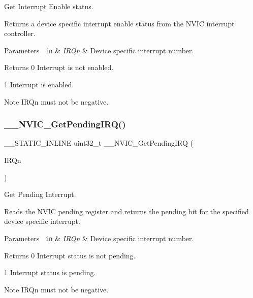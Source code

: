 Get Interrupt Enable status. 

Returns a device specific interrupt enable status from the N\+V\+IC interrupt controller. 
\begin{DoxyParams}[1]{Parameters}
\mbox{\texttt{ in}}  & {\em I\+R\+Qn} & Device specific interrupt number. \\
\hline
\end{DoxyParams}
\begin{DoxyReturn}{Returns}
0 Interrupt is not enabled. 

1 Interrupt is enabled. 
\end{DoxyReturn}
\begin{DoxyNote}{Note}
I\+R\+Qn must not be negative. 
\end{DoxyNote}
\mbox{\label{group___c_m_s_i_s___core___n_v_i_c_functions_ga5a92ca5fa801ad7adb92be7257ab9694}} 
\subsubsection{\texorpdfstring{\_\_NVIC\_GetPendingIRQ()}{\_\_NVIC\_GetPendingIRQ()}}
{\footnotesize\ttfamily \+\_\+\+\_\+\+S\+T\+A\+T\+I\+C\+\_\+\+I\+N\+L\+I\+NE uint32\+\_\+t \+\_\+\+\_\+\+N\+V\+I\+C\+\_\+\+Get\+Pending\+I\+RQ (\begin{DoxyParamCaption}\item[{\mbox{\hyperlink{group___configuration__section__for___c_m_s_i_s_ga7e1129cd8a196f4284d41db3e82ad5c8}{I\+R\+Qn\+\_\+\+Type}}}]{I\+R\+Qn }\end{DoxyParamCaption})}



Get Pending Interrupt. 

Reads the N\+V\+IC pending register and returns the pending bit for the specified device specific interrupt. 
\begin{DoxyParams}[1]{Parameters}
\mbox{\texttt{ in}}  & {\em I\+R\+Qn} & Device specific interrupt number. \\
\hline
\end{DoxyParams}
\begin{DoxyReturn}{Returns}
0 Interrupt status is not pending. 

1 Interrupt status is pending. 
\end{DoxyReturn}
\begin{DoxyNote}{Note}
I\+R\+Qn must not be negative. 
\end{DoxyNote}
\mbox{\label{group___c_m_s_i_s___core___n_v_i_c_functions_gaeb9dc99c8e7700668813144261b0bc73}} 
